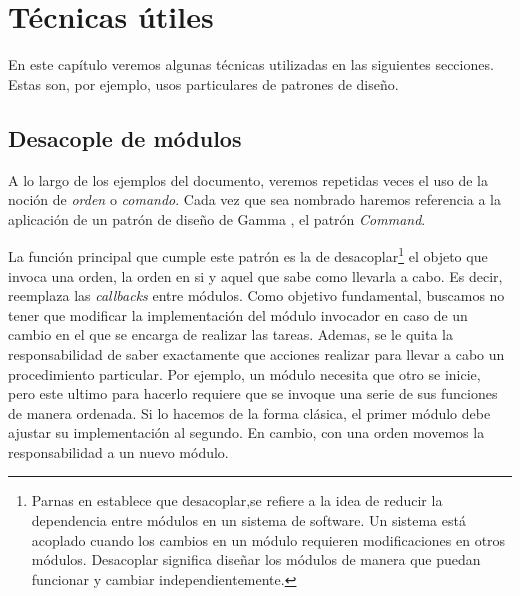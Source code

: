 %
%


\chapter{Técnicas útiles}
En este capítulo veremos algunas técnicas utilizadas en las siguientes secciones. Estas son, por ejemplo, usos particulares de patrones de diseño.


\section{Desacople de módulos}

A lo largo de los ejemplos del documento, veremos repetidas veces el uso de la noción de \textit{orden} o \textit{comando}. Cada vez que sea nombrado haremos referencia a la aplicación de un patrón de diseño de Gamma \cite{Gamma:1995:DPE:186897}, el patrón \textit{Command}. 

La función principal que cumple este patrón es la de desacoplar\footnote{Parnas en \cite{Parnas1972} establece que desacoplar,se refiere a la idea de reducir la dependencia entre módulos en un sistema de software. Un sistema está acoplado cuando los cambios en un módulo requieren modificaciones en otros módulos. Desacoplar significa diseñar los módulos de manera que puedan funcionar y cambiar independientemente.} el objeto que invoca una orden, la orden en si y aquel que sabe como llevarla a cabo. Es decir, reemplaza las \textit{callbacks} entre módulos. Como objetivo fundamental, buscamos no tener que modificar la implementación del módulo invocador en caso de un cambio en el que se encarga de realizar las tareas. Ademas, se le quita la responsabilidad de saber exactamente que acciones realizar para llevar a cabo un procedimiento particular. Por ejemplo, un módulo necesita que otro se inicie, pero este ultimo para hacerlo requiere que se invoque una serie de sus funciones de manera ordenada. Si lo hacemos de la forma clásica, el primer módulo debe ajustar su implementación al segundo. En cambio, con una orden movemos la responsabilidad a un nuevo módulo.

